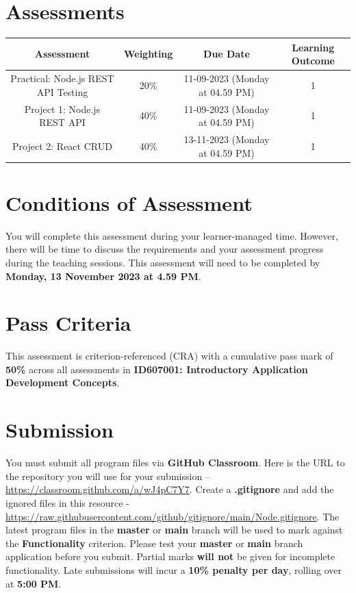 \documentclass{article}
\begin{document}
\section*{Assessments}
\renewcommand{\arraystretch}{1.5}
\begin{tabular}{|c|c|c|c|}
	\hline
	\textbf{Assessment}                                 & \textbf{Weighting} & \textbf{Due Date}            & \textbf{Learning Outcome} \\ \hline
	\small Practical: Node.js REST API Testing & \small 20\%        & \small 11-09-2023 (Monday at 04.59 PM)   & \small 1                   \\ \hline
	\small Project 1: Node.js REST API                  & \small 40\%        & \small \small 11-09-2023 (Monday at 04.59 PM) & \small 1                   \\ \hline
	\small Project 2: React CRUD                        & \small 40\%        & \small 13-11-2023 (Monday at 04.59 PM)  & \small 1                   \\ \hline
\end{tabular}

\section*{Conditions of Assessment}
You will complete this assessment during your learner-managed time. However, there will be time to discuss the requirements and your assessment progress during the teaching sessions. This assessment will need to be completed by \textbf{Monday, 13 November 2023 at 4.59 PM}.

\section*{Pass Criteria}
This assessment is criterion-referenced (CRA) with a cumulative pass mark of \textbf{50\%} across all assessments in \textbf{ID607001: Introductory Application Development Concepts}.

\section*{Submission}
You must submit all program files via \textbf{GitHub Classroom}. Here is the URL to the repository you will use for your submission – \href{https://classroom.github.com/a/wJ4pC7Y7}{https://classroom.github.com/a/wJ4pC7Y7}. Create a \textbf{.gitignore} and add the ignored files in this resource - \href{https://raw.githubusercontent.com/github/gitignore/main/Node.gitignore}{https://raw.githubusercontent.com/github/gitignore/main/Node.gitignore}. The latest program files in the \textbf{master} or \textbf{main} branch will be used to mark against the \textbf{Functionality} criterion. Please test your \textbf{master} or \textbf{main} branch application before you submit. Partial marks \textbf{will not} be given for incomplete functionality. Late submissions will incur a \textbf{10\% penalty per day}, rolling over at \textbf{5:00 PM}.
\end{document}
